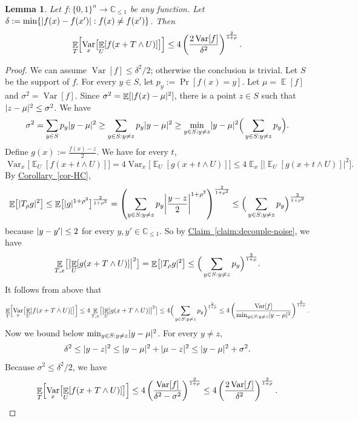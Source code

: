 \documentclass[11pt]{article}
\numberwithin{equation}{section}
\newtheorem{lemma}[theorem]{Lemma}
\theoremstyle{definition}
\theoremstyle{plain}
\newcommand{\C}{\mathbb C}
\newcommand{\expref}[2]{\hyperref[#2]{#1~\ref{#2}}}
\newcommand{\zo}{\{0,1\}}
\DeclarePairedDelimiter{\abs}{\lvert}{\rvert}
\DeclareMathOperator*{\E}{\mathbb{E}}                 %
\DeclareMathOperator*{\Var}{Var}                 %
\begin{document}
  \begin{lemma} \label{lemma:noise-reduce-var}
    Let $f \colon \zo^n \to \C_{\le 1}$ be any function.
    Let $\delta := \min\{ \abs{f(x) - f(x')}: f(x) \neq f(x') \}$. 
    Then 
    \[
      \E_T \Bigl[ \Var_x \bigl[ \E_U [f(x + T \wedge U)] \bigr] \Bigr]
      \le 4 \left( \frac{2\Var[f]}{\delta^2} \right)^{\frac{2}{1 + \rho}} .
    \]
  \end{lemma}
  \begin{proof}
    We can assume $\Var[f] \le \delta^2/2$; otherwise the conclusion is trivial.
    Let $S$ be the support of $f$.
    For every $y \in S$, let $p_y := \Pr[f(x) = y]$.
    Let $\mu = \E[f]$ and $\sigma^2 = \Var[f]$.
    Since $\sigma^2 = \E[\abs{f(x) - \mu}^2]$, there is a point $z \in S$ such that $\abs{z - \mu}^2 \le \sigma^2$.
    We have
    \[
      \sigma^2
      = \sum_{y \in S} p_y \abs{ y - \mu }^2
      \ge \sum_{y \in S: y \neq z} p_y \abs{ y - \mu }^2
      \ge \min_{y \in S: y \neq z} \abs{ y - \mu }^2 \Big( \sum_{y \in S: y \neq z} p_y \Big) .
    \]
    Define $g(x) := \frac{f(x) - z}{2}$.
    We have for every $t$,
    \[
      \Var_x \bigl[ \E_U [f (x + t \wedge U) ] \bigr]
      = 4 \Var_x \bigl[ \E_U [g (x + t \wedge U) ] \bigr]
      \le 4 \E_x \bigl[ \bigl| \E_U [g (x + t \wedge U) ] \bigr|^2 \bigr] .
    \]
    By \expref{Corollary}{cor-HC}, 
    \[
      \E \bigl[\abs{T_\rho g}^2 \bigr]
      \le \E \bigl[ \abs{g}^{1 + \rho^2} \bigr]^{\frac{2}{1 + \rho^2}}
      = \left( \sum_{ y \in S: y \neq z } p_y \abs*{ \frac{y - z}{2} }^{1 + \rho^2} \right)^{\frac{2}{1 + \rho^2}}
      \le \Big( \sum_{y \in S: y \neq z} p_y \Big)^{\frac{2}{1 + \rho^2}}
    \]
    because $\abs{y - y'} \le 2$ for every $y, y' \in \C_{\le 1}$.
    So by \expref{Claim}{claim:decouple-noise}, we have 
    \[
      \E_{T,x} \bigl[ \bigl| \E_U [g (x + T \wedge U) ] \bigr|^2 \bigr]
      = \E \bigl[ \abs{T_\rho g}^2 \bigr]
      \le \Big( \sum_{y \in S: y \neq z} p_y \Big)^{\frac{2}{1 + \rho}} .
    \]
    It follows from above that
    \[
      \E_T \Bigl[ \Var_x \bigl[ \E_U [f(x + T \wedge U)] \bigr] \Bigr]
      \le 4 \E_{T,x} \bigl[ \bigl| \E_U [g (x + T \wedge U) ] \bigr|^2 \bigr] \\
      \le 4 \Big( \sum_{y \in S: y \neq z} p_y \Big)^{\frac{2}{1 + \rho}}  \\
      \le 4 \left( \frac{\Var[f]}{\min_{y \in S: y \neq z} \abs{y - \mu}^2} \right)^{\frac{2}{1 + \rho}} .
    \]
    Now we bound below $\min_{y \in S: y \neq z} \abs{y - \mu}^2$.
    For every $y \neq z$,
    \[
      \delta^2
      \le \abs{y - z}^2
      \le \abs{y - \mu}^2 + \abs{\mu - z}^2
      \le \abs{y - \mu}^2 + \sigma^2 .
    \]
    Because $\sigma^2 \le \delta^2/2$, we have
    \[
      \E_T \Bigl[ \Var_x \bigl[ \E_U [f(x + T \wedge U)] \bigr] \Bigr]
      \le 4 \left( \frac{\Var[f]}{ \delta^2  - \sigma^2 } \right)^{\frac{2}{1 + \rho}}
      \le 4 \left( \frac{2 \Var[f]}{ \delta^2 } \right)^{\frac{2}{1 + \rho}} . \qedhere
    \]
  \end{proof}
  
\end{document}

